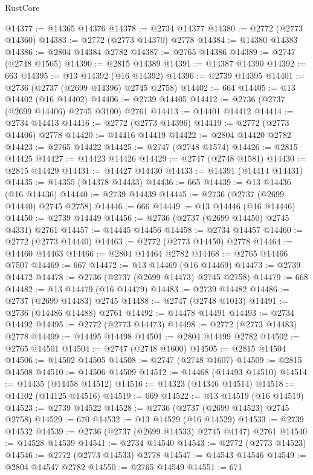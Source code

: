 \begin{lexlean}{RustCore}
\begin{coremodule}
@14377 := @14365 @14376
@14378 := @2734 @14377
@14380 := @2772 (@2773 @14360)
@14383 := @2772 (@2773 @14370) @2778
@14384 := @14380 @14383
@14386 := @2804 @14384 @2782
@14387 := @2765 @14386
@14389 := @2747 (@2748 @1565)
@14390 := @2815 @14389
@14391 := @14387 @14390
@14392 := 663
@14395 := @13 @14392 (@16 @14392)
@14396 := @2739 @14395
@14401 := @2736 (@2737 (@2699 @14396) @2745 @2758)
@14402 := 664
@14405 := @13 @14402 (@16 @14402)
@14406 := @2739 @14405
@14412 := @2736 (@2737 (@2699 @14406) @2745 @3100) @2761
@14413 := @14401 @14412
@14414 := @2734 @14413
@14416 := @2772 (@2773 @14396)
@14419 := @2772 (@2773 @14406) @2778
@14420 := @14416 @14419
@14422 := @2804 @14420 @2782
@14423 := @2765 @14422
@14425 := @2747 (@2748 @1574)
@14426 := @2815 @14425
@14427 := @14423 @14426
@14429 := @2747 (@2748 @1581)
@14430 := @2815 @14429
@14431 := @14427 @14430
@14433 := @14391 (@14414 @14431)
@14435 := @14355 (@14378 @14433)
@14436 := 665
@14439 := @13 @14436 (@16 @14436)
@14440 := @2739 @14439
@14445 := @2736 (@2737 (@2699 @14440) @2745 @2758)
@14446 := 666
@14449 := @13 @14446 (@16 @14446)
@14450 := @2739 @14449
@14456 := @2736 (@2737 (@2699 @14450) @2745 @4331) @2761
@14457 := @14445 @14456
@14458 := @2734 @14457
@14460 := @2772 (@2773 @14440)
@14463 := @2772 (@2773 @14450) @2778
@14464 := @14460 @14463
@14466 := @2804 @14464 @2782
@14468 := @2765 @14466 @7507
@14469 := 667
@14472 := @13 @14469 (@16 @14469)
@14473 := @2739 @14472
@14478 := @2736 (@2737 (@2699 @14473) @2745 @2758)
@14479 := 668
@14482 := @13 @14479 (@16 @14479)
@14483 := @2739 @14482
@14486 := @2737 (@2699 @14483) @2745
@14488 := @2747 (@2748 @1013)
@14491 := @2736 (@14486 @14488) @2761
@14492 := @14478 @14491
@14493 := @2734 @14492
@14495 := @2772 (@2773 @14473)
@14498 := @2772 (@2773 @14483) @2778
@14499 := @14495 @14498
@14501 := @2804 @14499 @2782
@14502 := @2765 @14501
@14504 := @2747 (@2748 @1600)
@14505 := @2815 @14504
@14506 := @14502 @14505
@14508 := @2747 (@2748 @1607)
@14509 := @2815 @14508
@14510 := @14506 @14509
@14512 := @14468 (@14493 @14510)
@14514 := @14435 (@14458 @14512)
@14516 := @14323 (@14346 @14514)
@14518 := @14102 (@14125 @14516)
@14519 := 669
@14522 := @13 @14519 (@16 @14519)
@14523 := @2739 @14522
@14528 := @2736 (@2737 (@2699 @14523) @2745 @2758)
@14529 := 670
@14532 := @13 @14529 (@16 @14529)
@14533 := @2739 @14532
@14539 := @2736 (@2737 (@2699 @14533) @2745 @4147) @2761
@14540 := @14528 @14539
@14541 := @2734 @14540
@14543 := @2772 (@2773 @14523)
@14546 := @2772 (@2773 @14533) @2778
@14547 := @14543 @14546
@14549 := @2804 @14547 @2782
@14550 := @2765 @14549
@14551 := 671

\end{coremodule}
\end{lexlean}
